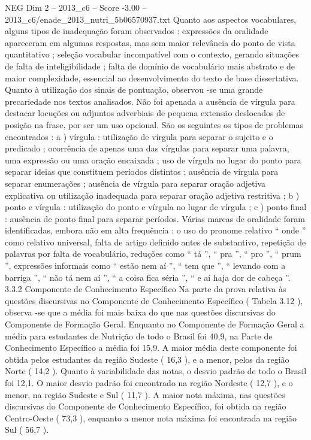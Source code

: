 \begin{textsample}{NEG Dim 2 – 2013\_c6 – Score -3.00 – 2013\_c6/enade\_2013\_nutri\_5b06570937.txt}
Quanto aos aspectos vocabulares, alguns tipos de inadequação foram observados : expressões da oralidade apareceram em algumas respostas, mas sem maior relevância do ponto de vista quantitativo ; seleção vocabular incompatível com o contexto, gerando situações de falta de inteligibilidade ; falta de domínio de vocabulário mais abstrato e de maior complexidade, essencial ao desenvolvimento do texto de base dissertativa.
Quanto à utilização dos sinais de pontuação, observou -se uma grande precariedade nos textos analisados.
Não foi apenada a ausência de vírgula para destacar locuções ou adjuntos adverbiais de pequena extensão deslocados de posição na frase, por ser um uso opcional.
São os seguintes os tipos de problemas encontrados : a ) vírgula : utilização de vírgula para separar o sujeito e o predicado ; ocorrência de apenas uma das vírgulas para separar uma palavra, uma expressão ou uma oração encaixada ; uso de vírgula no lugar do ponto para separar ideias que constituem períodos distintos ; ausência de vírgula para separar enumerações ; ausência de vírgula para separar oração adjetiva explicativa ou utilização inadequada para separar oração adjetiva restritiva ; b ) ponto e vírgula : utilização do ponto e vírgula no lugar de vírgula ; c ) ponto final : ausência de ponto final para separar períodos.
Várias marcas de oralidade foram identificadas, embora não em alta frequência : o uso do pronome relativo “ onde ” como relativo universal, falta de artigo definido antes de substantivo, repetição de palavras por falta de vocabulário, reduções como “ tá ”, “ pra ”, “ pro ”, “ prum ”, expressões informais como “ estão nem aí ”, “ tem que ”, “ levando com a barriga ”, “ não tá nem aí ”, “ a coisa fica séria ”, “ e aí haja dor de cabeça ”. 3.3.2 Componente de Conhecimento Específico Na parte da prova relativa às questões discursivas no Componente de Conhecimento Específico ( Tabela 3.12 ), observa -se que a média foi mais baixa do que nas questões discursivas do Componente de Formação Geral.
Enquanto no Componente de Formação Geral a média para estudantes de Nutrição de todo o Brasil foi 40,9, na Parte de Conhecimento Específico a média foi 15,9.
A maior média deste componente foi obtida pelos estudantes da região Sudeste ( 16,3 ), e a menor, pelos da região Norte ( 14,2 ).
Quanto à variabilidade das notas, o desvio padrão de todo o Brasil foi 12,1.
O maior desvio padrão foi encontrado na região Nordeste ( 12,7 ), e o menor, na região Sudeste e Sul ( 11,7 ).
A maior nota máxima, nas questões discursivas do Componente de Conhecimento Específico, foi obtida na região Centro-Oeste ( 73,3 ), enquanto a menor nota máxima foi encontrada na região Sul ( 56,7 ).

\end{textsample}
